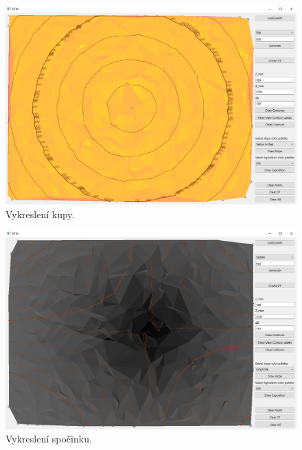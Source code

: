 \documentclass[a4paper, 12pt, oneside, titlepage]{article} %
\begin{document}
\begin{figure}[!htb]
	\centering
	\includegraphics[scale=0.45]{obrazky/kupa.png} 
	\caption{Vykreslení kupy.
	}
	\label{fig:kupa}
\end{figure} 
\FloatBarrier

\begin{figure}[!htb]
	\centering
	\includegraphics[scale=0.45]{obrazky/spocinek.png} 
	\caption{Vykreslení spočinku.
	}
	\label{fig:spocinek}
\end{figure} 
\FloatBarrier
\end{document}
